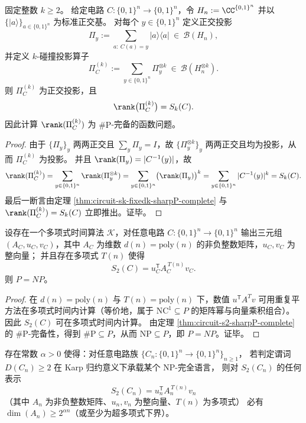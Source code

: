 \begin{corollary}\label{cor:circuit-k-collision-projector-rank-sharpP-complete}
固定整数 \(k\ge 2\)。
给定电路 \(C:\{0,1\}^n\to\{0,1\}^n\)，令 \(H_n:=\CC^{\{0,1\}^n}\) 并以 \(\{\lvert a\rangle\}_{a\in\{0,1\}^n}\) 为标准正交基。
对每个 \(y\in\{0,1\}^n\) 定义正交投影
\[
\Pi_y:=\sum_{a:\ C(a)=y}\lvert a\rangle\langle a\rvert\ \in\ \mathcal{B}(H_n),
\]
并定义 \(k\)-碰撞投影算子
\[
\Pi_C^{(k)}:=\sum_{y\in\{0,1\}^n}\Pi_y^{\otimes k}\ \in\ \mathcal{B}(H_n^{\otimes k}).
\]
则 \(\Pi_C^{(k)}\) 为正交投影，且
\[
\rank\bigl(\Pi_C^{(k)}\bigr)=S_k(C).
\]
因此计算 \(\rank(\Pi_C^{(k)})\) 为 \(\#\mathrm{P}\)-完备的函数问题。
\end{corollary}
\begin{proof}
由于 \(\{\Pi_y\}_{y}\) 两两正交且 \(\sum_y\Pi_y=I\)，故 \(\{\Pi_y^{\otimes k}\}_{y}\) 两两正交且均为投影，从而 \(\Pi_C^{(k)}\) 为投影。
并且 \(\rank(\Pi_y)=|C^{-1}(y)|\)，故
\[
\rank(\Pi_C^{(k)})
=\sum_{y\in\{0,1\}^n}\rank(\Pi_y^{\otimes k})
=\sum_{y\in\{0,1\}^n}\bigl(\rank(\Pi_y)\bigr)^k
=\sum_{y\in\{0,1\}^n}|C^{-1}(y)|^k
=S_k(C).
\]
最后一断言由定理 \ref{thm:circuit-sk-fixedk-sharpP-complete} 与 \(\rank(\Pi_C^{(k)})=S_k(C)\) 立即推出。证毕。
\end{proof}

\begin{proposition}[通用可编译碰撞核将强迫 \texorpdfstring{$P=NP$}{P=NP}]\label{prop:universal-compilable-collision-kernel-implies-p-np}
设存在一个多项式时间算法 \(\mathcal K\)，对任意电路 \(C:\{0,1\}^n\to\{0,1\}^n\) 输出三元组 \((A_C,u_C,v_C)\)，其中 \(A_C\) 为维数 \(d(n)=\mathrm{poly}(n)\) 的非负整数矩阵，\(u_C,v_C\) 为整向量；
并且存在多项式 \(T(n)\) 使得
\[
S_2(C)=u_C^{\mathsf T}A_C^{\,T(n)}v_C.
\]
则 \(P=NP\)。
\end{proposition}

\begin{proof}
在 \(d(n)=\mathrm{poly}(n)\) 与 \(T(n)=\mathrm{poly}(n)\) 下，数值 \(u^{\mathsf T}A^{T}v\) 可用重复平方法在多项式时间内计算（等价地，属于 \(\mathrm{NC}^1\subseteq P\) 的矩阵幂与向量乘积组合）。
因此 \(S_2(C)\) 可在多项式时间内计算。
由定理 \ref{thm:circuit-s2-sharpP-complete} 的 \(\#\mathrm{P}\)-完备性，得到 \(\#\mathrm{P}\subseteq P\)，从而 \(\mathrm{NP}\subseteq P\)，即 \(P=NP\)。证毕。
\end{proof}

\begin{conjecture}[NP 完全性强迫碰撞核维数超多项式增长]\label{conj:collision-kernel-dimension-obstruction-np}
存在常数 \(\alpha>0\) 使得：对任意电路族 \(\{C_n:\{0,1\}^n\to\{0,1\}^n\}_{n\ge 1}\)，
若判定谓词 \(D(C_n)\ge 2\) 在 Karp 归约意义下承载某个 \(\mathrm{NP}\)-完全语言，
则对 \(S_2(C_n)\) 的任何表示
\[
S_2(C_n)=u_n^{\mathsf T}A_n^{\,T(n)}v_n
\]
（其中 \(A_n\) 为非负整数矩阵、\(u_n,v_n\) 为整向量、\(T(n)\) 为多项式）
必有 \(\dim(A_n)\ge 2^{\alpha n}\)（或至少为超多项式下界）。
\end{conjecture}

